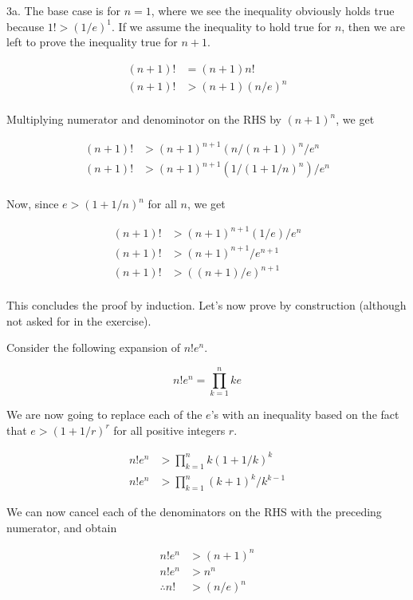 \documentclass{article}
\begin{document}
3a. The base case is for $n = 1$, where we see the inequality obviously holds true because $1! > (1 / e)^1$. If we assume the inequality to hold true for $n$, then we are left to prove the inequality true for $n + 1$.

\begin{align*}
    (n + 1)! &= (n + 1)n! \\
    (n + 1)! &> (n + 1)(n / e)^n \\
\end{align*}

Multiplying numerator and denominotor on the RHS by $(n + 1)^n$, we get

\begin{align*}
    (n + 1)! &> (n + 1)^{n + 1} (n / (n + 1))^n  / e^n \\
    (n + 1)! &> (n + 1)^{n + 1} (1 / (1 + 1 / n)^n) / e^n \\
\end{align*}

Now, since $e > (1 + 1 / n)^n$ for all $n$, we get

\begin{align*}
    (n + 1)! &> (n + 1)^{n + 1} (1 / e) / e^n \\
    (n + 1)! &> (n + 1)^{n + 1} / e^{n + 1} \\
    (n + 1)! &> ((n + 1) / e)^{n + 1} \\
\end{align*}

This concludes the proof by induction. Let's now prove by construction (although not asked for in the exercise).

Consider the following expansion of $n!e^n$.

\[ n!e^n = \prod_{k=1}^n ke \]

We are now going to replace each of the $e$'s with an inequality based on the fact that $e > (1 + 1 / r)^r$ for all positive integers $r$.

\begin{align*}
    n!e^n &> \prod_{k=1}^n k(1 + 1 /k)^k \\
    n!e^n &> \prod_{k=1}^n (k + 1)^k / k^{k - 1}
\end{align*}

We can now cancel each of the denominators on the RHS with the preceding numerator, and obtain

\begin{align*}
    n!e^n &> (n + 1)^n \\
    n!e^n &> n^n \\
    \therefore n! &> (n / e)^n
\end{align*}
\end{document}

